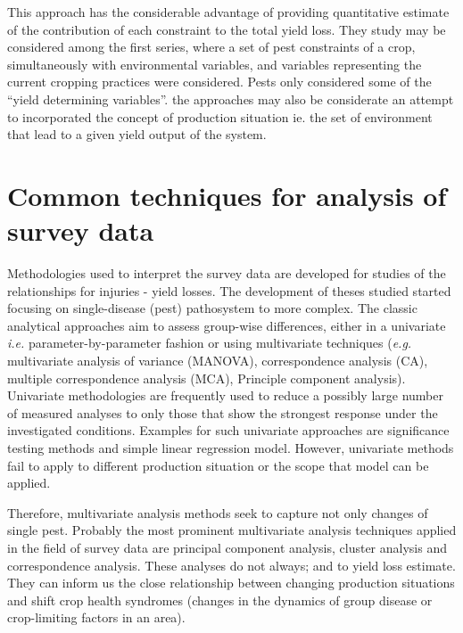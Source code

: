 \documentclass[12pt, oneside]{report}
\begin{document}
This approach has the considerable advantage of providing quantitative estimate of the contribution of each constraint to the total yield loss. They study may be considered among the first series, where a set of pest constraints of a crop, simultaneously with environmental variables, and variables representing the current cropping practices were considered. Pests only considered some of the ``yield determining variables''. the approaches may also be considerate an attempt to incorporated the concept of production situation ie. the set of environment that lead to a given yield output of the system. 

\section*{Common techniques for analysis of survey data}

Methodologies used to interpret the survey data are developed for studies of the relationships for injuries - yield losses. The development of theses studied started focusing on single-disease (pest) pathosystem to more complex. The classic analytical approaches aim to assess group-wise differences, either in a univariate \textit{i.e.} parameter-by-parameter fashion or using multivariate techniques (\textit{e.g.} multivariate analysis of variance (MANOVA), correspondence analysis (CA), multiple correspondence analysis (MCA), Principle component analysis). Univariate methodologies are frequently used to reduce a possibly large number of measured analyses to only those that show the strongest response under the investigated conditions. Examples for such univariate approaches are significance testing methods and simple linear regression model. However, univariate methods fail to apply to different production situation or the scope that model can be applied.


Therefore, multivariate analysis methods seek to capture not only changes of single pest. Probably the most prominent multivariate analysis techniques applied in the field of survey data are principal component analysis, cluster analysis and correspondence analysis. These analyses do not always; and to yield loss estimate. They can inform us the close relationship between changing production situations and shift crop health syndromes (changes in the dynamics of group disease or crop-limiting factors in an area). 
\end{document}

